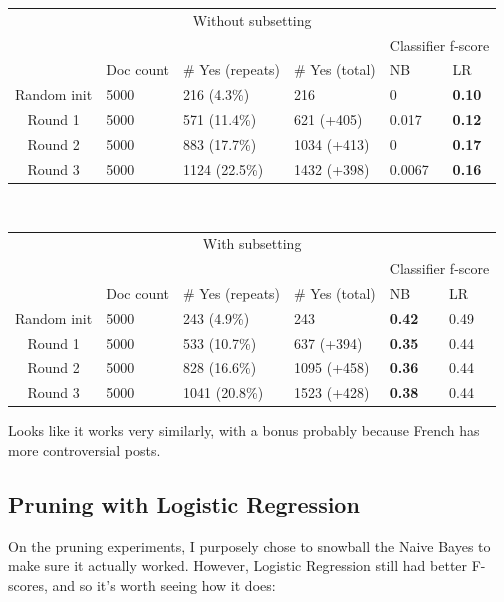 \documentclass[11pt]{article} %
\begin{document}
\begin{tabular}{|c|l|l|l|l|l|}
\multicolumn{6}{|c|}{Without subsetting} \\
\rowcolor{gray!50} &&&& \multicolumn{2}{|c|}{Classifier f-score} \\
\rowcolor{gray!50} & Doc count & \# Yes (repeats) & \# Yes (total) & NB & LR \\
Random init & 5000 & 216 (4.3\%) & 216 & 0 & \textbf{0.10} \\
Round 1 & 5000 &  571 (11.4\%) & 621 (+405)& 0.017 & \textbf{0.12} \\
Round 2 & 5000 & 883 (17.7\%) & 1034 (+413)& 0 & \textbf{0.17} \\
Round 3 & 5000 & 1124 (22.5\%) & 1432 (+398) & 0.0067 & \textbf{0.16} \\
\end{tabular}
\\
\begin{tabular}{|c|l|l|l|l|l|}
\multicolumn{6}{|c|}{With subsetting} \\
\rowcolor{gray!50} &&&& \multicolumn{2}{|c|}{Classifier f-score} \\
\rowcolor{gray!50} & Doc count & \# Yes (repeats) & \# Yes (total) & NB & LR \\
Random init & 5000 & 243 (4.9\%) & 243 & \textbf{0.42} & 0.49 \\
Round 1 & 5000 & 533 (10.7\%) & 637 (+394)& \textbf{0.35} & 0.44 \\
Round 2 & 5000 & 828 (16.6\%) & 1095 (+458)& \textbf{0.36} & 0.44 \\
Round 3 & 5000 & 1041 (20.8\%) & 1523 (+428)& \textbf{0.38} & 0.44 \\
\end{tabular}

Looks like it works very similarly, with a bonus probably because French has more controversial posts.

\subsection{Pruning with Logistic Regression}

On the pruning experiments, I purposely chose to snowball the Naive Bayes to make sure it actually worked. However, Logistic Regression still had better F-scores, and so it's worth seeing how it does: \\
\end{document}

